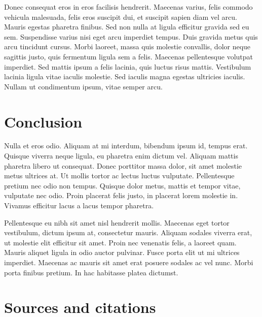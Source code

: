 \documentclass[a4paper, 11pt] {article}
\begin{document}
Donec consequat eros in eros facilisis hendrerit. Maecenas varius, felis commodo vehicula malesuada, felis eros suscipit dui, et suscipit sapien diam vel arcu. Mauris egestas pharetra finibus. Sed non nulla at ligula efficitur gravida sed eu sem. Suspendisse varius nisi eget arcu imperdiet tempus. Duis gravida metus quis arcu tincidunt cursus. Morbi laoreet, massa quis molestie convallis, dolor neque sagittis justo, quis fermentum ligula sem a felis. Maecenas pellentesque volutpat imperdiet. Sed mattis ipsum a felis lacinia, quis luctus risus mattis. Vestibulum lacinia ligula vitae iaculis molestie. Sed iaculis magna egestas ultricies iaculis. Nullam ut condimentum ipsum, vitae semper arcu. 




\section{Conclusion}

 Nulla et eros odio. Aliquam at mi interdum, bibendum ipsum id, tempus erat. Quisque viverra neque ligula, eu pharetra enim dictum vel. Aliquam mattis pharetra libero ut consequat. Donec porttitor massa dolor, sit amet molestie metus ultrices at. Ut mollis tortor ac lectus luctus vulputate. Pellentesque pretium nec odio non tempus. Quisque dolor metus, mattis et tempor vitae, vulputate nec odio. Proin placerat felis justo, in placerat lorem molestie in. Vivamus efficitur lacus a lacus tempor pharetra.

Pellentesque eu nibh sit amet nisl hendrerit mollis. Maecenas eget tortor vestibulum, dictum ipsum at, consectetur mauris. Aliquam sodales viverra erat, ut molestie elit efficitur sit amet. Proin nec venenatis felis, a laoreet quam. Mauris aliquet ligula in odio auctor pulvinar. Fusce porta elit ut mi ultrices imperdiet. Maecenas ac mauris sit amet erat posuere sodales ac vel nunc. Morbi porta finibus pretium. In hac habitasse platea dictumst. 

\section*{Sources and citations}
\end{document}
